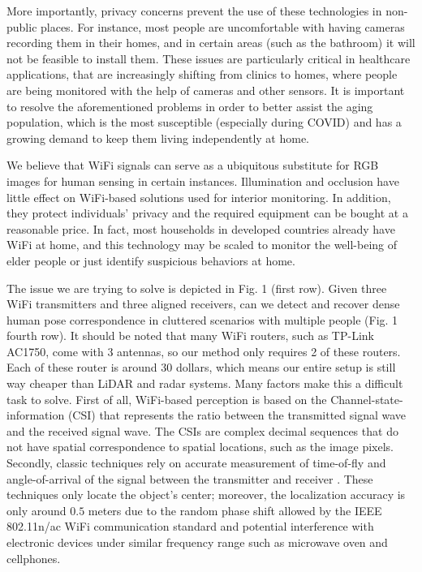 \documentclass[sigconf, anonymous=false]{acmart}
\begin{document}
More importantly, privacy concerns prevent the use of these technologies in non-public places. For instance, most people are uncomfortable with having cameras recording them in their homes, and in certain areas (such as the bathroom) it will not be feasible to install them. These issues are particularly critical in healthcare applications, that are increasingly shifting from clinics to homes, where people are being monitored with the help of cameras and other sensors. It is important to resolve the aforementioned problems in order to better assist the aging population, which is the most susceptible (especially during COVID) and has a growing demand to keep them living independently at home.  

We believe that WiFi signals can serve as a ubiquitous substitute for RGB images for human sensing in certain instances. Illumination and occlusion have little effect on WiFi-based solutions used for interior monitoring. In addition, they protect individuals' privacy and the required equipment can be bought at a reasonable price. In fact, most households in developed countries already have WiFi at home,  and this technology may be scaled to monitor the well-being of elder people or just identify suspicious behaviors at home. 

The issue we are trying to solve is depicted in Fig. 1 (first row). Given three WiFi transmitters and three aligned receivers, can we detect and recover dense human pose correspondence in cluttered scenarios with multiple people (Fig. 1 fourth row). It should be noted that many WiFi routers, such as TP-Link AC1750, come with 3 antennas, so our method only requires 2 of these routers. Each of these router is around 30 dollars, which means our entire setup is still way cheaper than LiDAR and radar systems. 
Many factors make this a difficult task to solve.  First of all, WiFi-based perception\cite{Person-in-wifi,wi2vi} is based on the Channel-state-information (CSI) that represents the ratio between the transmitted signal wave and the received signal wave. The CSIs are complex decimal sequences that do not have spatial correspondence to spatial locations, such as the image pixels.  Secondly, classic techniques rely on accurate measurement of time-of-fly and angle-of-arrival of the signal between the transmitter and receiver \cite{Decimeter_Level_WiFi_Localization,ultra-wideband}. These techniques only locate the object's center; moreover, the localization accuracy is only around $0.5$ meters due to the random phase shift allowed by the IEEE 802.11n/ac WiFi communication standard and potential interference with electronic devices under similar frequency range such as microwave oven and cellphones.
\end{document}
